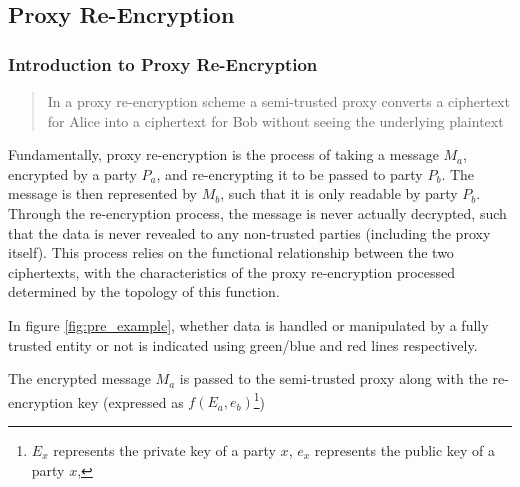 \subsection{Proxy Re-Encryption}

\subsubsection{Introduction to Proxy Re-Encryption}

\blockquote{In a proxy re-encryption scheme a semi-trusted proxy converts a ciphertext for Alice into a ciphertext for Bob without seeing the underlying plaintext}\autocite{greenateniese:2006:article}

Fundamentally, proxy re-encryption is the process of taking a message $M_a$, encrypted by a party $P_a$, and re-encrypting it to be passed to party $P_b$. The message is then represented by $M_b$, such that it is only readable by party $P_b$. Through the re-encryption process, the message is never actually decrypted, such that the data is never revealed to any non-trusted parties (including the proxy itself). This process relies on the functional relationship between the two ciphertexts, with the characteristics of the proxy re-encryption processed determined by the topology of this function.



In figure \ref{fig:pre_example}, whether data is handled or manipulated by a fully trusted entity or not is indicated using green/blue and red lines respectively.

The encrypted message $M_a$ is passed to the semi-trusted proxy along with the re-encryption key (expressed as $f(E_a, e_b)$\footnote{$E_x$ represents the private key of a party $x$, $e_x$ represents the public key of a party $x$,})




